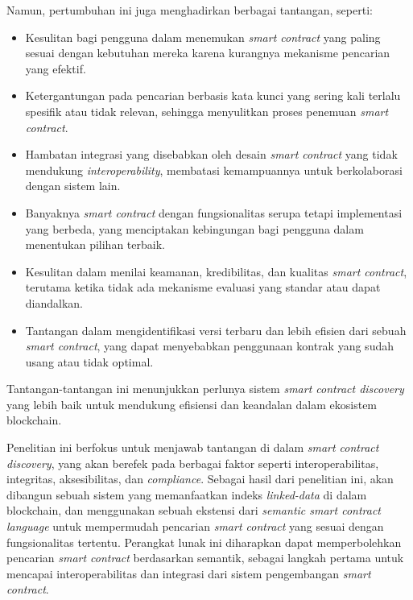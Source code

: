 Namun, pertumbuhan ini juga menghadirkan berbagai tantangan, seperti:
\begin{itemize}
    \item Kesulitan bagi pengguna dalam menemukan \textit{smart contract} yang paling sesuai dengan kebutuhan mereka karena kurangnya mekanisme pencarian yang efektif.
    \item Ketergantungan pada pencarian berbasis kata kunci yang sering kali terlalu spesifik atau tidak relevan, sehingga menyulitkan proses penemuan \textit{smart contract}.
    \item Hambatan integrasi yang disebabkan oleh desain \textit{smart contract} yang tidak mendukung \textit{interoperability}, membatasi kemampuannya untuk berkolaborasi dengan sistem lain.
    \item Banyaknya \textit{smart contract} dengan fungsionalitas serupa tetapi implementasi yang berbeda, yang menciptakan kebingungan bagi pengguna dalam menentukan pilihan terbaik.
    \item Kesulitan dalam menilai keamanan, kredibilitas, dan kualitas \textit{smart contract}, terutama ketika tidak ada mekanisme evaluasi yang standar atau dapat diandalkan.
    \item Tantangan dalam mengidentifikasi versi terbaru dan lebih efisien dari sebuah \textit{smart contract}, yang dapat menyebabkan penggunaan kontrak yang sudah usang atau tidak optimal.
\end{itemize}

Tantangan-tantangan ini menunjukkan perlunya sistem \textit{smart contract discovery} yang lebih baik untuk mendukung efisiensi dan keandalan dalam ekosistem blockchain.



Penelitian ini berfokus untuk menjawab tantangan di dalam \textit{smart contract discovery}, yang akan berefek pada berbagai faktor seperti interoperabilitas, integritas, aksesibilitas, dan \textit{compliance}. Sebagai hasil dari penelitian ini, akan dibangun sebuah sistem yang memanfaatkan indeks \textit{linked-data} di dalam blockchain, dan menggunakan sebuah ekstensi dari \textit{semantic smart contract language} untuk mempermudah pencarian \textit{smart contract} yang sesuai dengan fungsionalitas tertentu. Perangkat lunak ini diharapkan dapat memperbolehkan pencarian \textit{smart contract} berdasarkan semantik, sebagai langkah pertama untuk mencapai interoperabilitas dan integrasi dari sistem pengembangan \textit{smart contract}.

